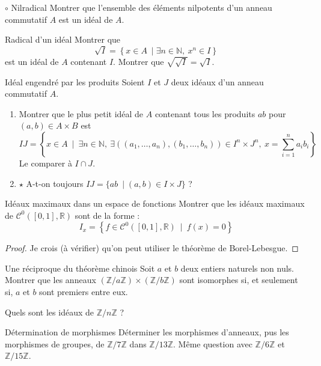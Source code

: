 \documentclass[french,a4paper]{article}
\newcommand{\N}{\mathbb{N}}
\newcommand{\Z}{\mathbb{Z}}
\newcommand{\R}{\mathbb{R}}
\theoremstyle{plain}
\theoremstyle{definition}
\theoremstyle{remark}
\begin{document}
\begin{ex}[Moulin.AG.33]{$\circ$ Nilradical}
	Montrer que l'ensemble des éléments nilpotents d'un anneau commutatif $A$ est un idéal de $A$.
\end{ex}

\begin{ex}[Moulin.AG.32]{Radical d'un idéal}
	Montrer que $$\sqrt{I}=\left\{x\in A \ \mid \exists n\in\N,\ x^n\in I\right\}$$ est un idéal de $A$ contenant $I$. Montrer que $\displaystyle\sqrt{\sqrt{I}}=\sqrt{I}$.
\end{ex}

\begin{ex}[Moulin.AG.34]{Idéal engendré par les produits}
	Soient $I$ et $J$ deux idéaux d'un anneau commutatif $A$.
	\begin{enumerate}
		\item Montrer que le plus petit idéal de $A$ contenant tous les produits $ab$ pour $(a,b)\in A\times B$ est $$IJ=\left\{x\in A\ \mid\ \exists n\in\N,\ \exists((a_1,\ldots,a_n),(b_1,\ldots,b_n))\in I^n\times J^n,\ x=\sum_{i=1}^{n}a_ib_i\right\}$$ Le comparer à $I\cap J$.
		\item $\star$ A-t-on toujours $IJ=\{ab\ \mid (a,b)\in I\times J\}$ ?
	\end{enumerate}
\end{ex}

\begin{ex}[X]{Idéaux maximaux dans un espace de fonctions}
	Montrer que les idéaux maximaux de $\mathcal{C}^0([0,1],\R)$ sont de la forme : $$I_x=\left\{f\in\mathcal{C}^0([0,1],\R)\ \mid\ f(x)=0\right\}$$
\end{ex}

\begin{proof}
	Je crois (à vérifier) qu'on peut utiliser le théorème de Borel-Lebesgue.
\end{proof}

\begin{ex}[Moulin.AG.35]{Une réciproque du théorème chinois}
	Soit $a$ et $b$ deux entiers naturels non nuls. Montrer que les anneaux $(\Z/a\Z)\times(\Z/b\Z)$ sont isomorphes si, et seulement si, $a$ et $b$ sont premiers entre eux.
\end{ex}

\begin{ex}[Moulin.AG.36]{}
	Quels sont les idéaux de $\Z/n\Z$ ?
\end{ex}

\begin{ex}[Moulin.AG.37]{Détermination de morphismes}
	Déterminer les morphismes d'anneaux, pus les morphismes de groupes, de $\Z/7\Z$ dans $\Z/13\Z$. Même question avec $\Z/6\Z$ et $\Z/15\Z$.
\end{ex}
\end{document}

